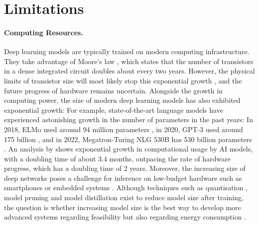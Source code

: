 \section{Limitations}
\paragraph{Computing Resources.} Deep learning models are typically trained on modern computing infrastructure. They take advantage of Moore's law , which states that the number of transistors in a dense integrated circuit doubles about every two years. However, the physical limits of transistor size will most likely stop this exponential growth , and the future progress of hardware remains uncertain.
Alongside the growth in computing power, the size of modern deep learning models has also exhibited exponential growth:
For example, state-of-the-art language models have experienced astonishing growth in the number of parameters in the past years: In 2018, ELMo used around 94 million parameters , in 2020, GPT-3 used around 175 billion , and in 2022, Megatron-Turing NLG 530B has 530 billion parameters .
An analysis by  shows exponential growth in computational usage by AI models, with a doubling time of about 3.4 months, outpacing the rate of hardware progress, which has a doubling time of 2 years. Moreover, the increasing size of deep networks poses a challenge for inference on low-budget hardware such as smartphones or embedded systems . Although techniques such as quantisation , model pruning  and model distillation  exist to reduce model size after training, the question is whether increasing model size is the best way to develop more advanced systems regarding feasibility but also regarding energy consumption \cite{garcia-martin_estimation_2019}.


